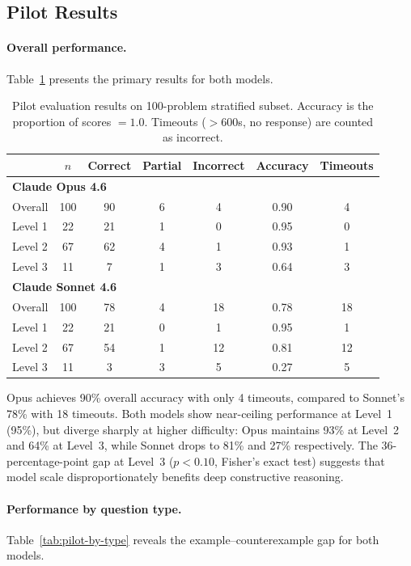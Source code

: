 \subsection{Pilot Results}

\paragraph{Overall performance.}
Table~\ref{tab:pilot-results} presents the primary results for both models.

\begin{table}[ht]
\centering
\caption{Pilot evaluation results on 100-problem stratified subset. Accuracy is the proportion of scores $= 1.0$. Timeouts ($>$600s, no response) are counted as incorrect.}
\label{tab:pilot-results}
\begin{tabular}{lcccccc}
\toprule
& \textbf{$n$} & \textbf{Correct} & \textbf{Partial} & \textbf{Incorrect} & \textbf{Accuracy} & \textbf{Timeouts} \\
\midrule
\multicolumn{7}{l}{\textbf{Claude Opus 4.6}} \\
\quad Overall & 100 & 90 & 6 & 4 & 0.90 & 4 \\
\quad Level 1 & 22 & 21 & 1 & 0 & 0.95 & 0 \\
\quad Level 2 & 67 & 62 & 4 & 1 & 0.93 & 1 \\
\quad Level 3 & 11 & 7 & 1 & 3 & 0.64 & 3 \\
\midrule
\multicolumn{7}{l}{\textbf{Claude Sonnet 4.6}} \\
\quad Overall & 100 & 78 & 4 & 18 & 0.78 & 18 \\
\quad Level 1 & 22 & 21 & 0 & 1 & 0.95 & 1 \\
\quad Level 2 & 67 & 54 & 1 & 12 & 0.81 & 12 \\
\quad Level 3 & 11 & 3 & 3 & 5 & 0.27 & 5 \\
\bottomrule
\end{tabular}
\end{table}

Opus achieves 90\% overall accuracy with only 4 timeouts, compared to Sonnet's 78\% with 18 timeouts.
Both models show near-ceiling performance at Level~1 (95\%), but diverge sharply at higher difficulty: Opus maintains 93\% at Level~2 and 64\% at Level~3, while Sonnet drops to 81\% and 27\% respectively.
The 36-percentage-point gap at Level~3 ($p < 0.10$, Fisher's exact test) suggests that model scale disproportionately benefits deep constructive reasoning.

\paragraph{Performance by question type.}
Table~\ref{tab:pilot-by-type} reveals the example--counterexample gap for both models.

